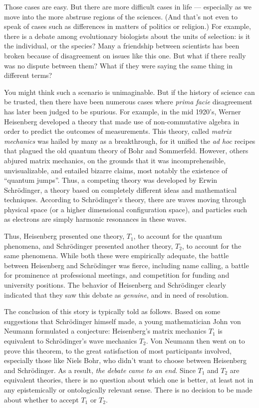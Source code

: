 Those cases are easy.  But there are more difficult cases in life ---
especially as we move into the more abstruse regions of the sciences.
(And that's not even to speak of cases such as differences in matters
of politics or religion.)  For example, there is a debate among
evolutionary biologists about the units of selection: is it the
individual, or the species?  Many a friendship between scientists has
been broken because of disagreement on issues like this one.  But what
if there really was no dispute between them?  What if they were saying
the same thing in different terms?

You might think such a scenario is unimaginable.  But if the history
of science can be trusted, then there have been numerous cases where
{\it prima facie} disagreement has later been judged to be spurious.
For example, in the mid 1920's, Werner Heisenberg developed a theory
that made use of non-commutative algebra in order to predict the
outcomes of measurements.  This theory, called {\it matrix mechanics}
was hailed by many as a breakthrough, for it unified the {\it ad hoc}
recipes that plagued the old quantum theory of Bohr and Sommerfeld.
However, others abjured matrix mechanics, on the grounds that it was
incomprehensible, unvisualizable, and entailed bizarre claims, most
notably the existence of ``quantum jumps''.  Thus, a competing theory
was developed by Erwin Schr{\"o}dinger, a theory based on completely
different ideas and mathematical techniques.  According to
Schr{\"o}dinger's theory, there are waves moving through physical
space (or a higher dimensional configuration space), and particles
such as electrons are simply harmonic resonances in these waves.

Thus, Heisenberg presented one theory, $T_1$, to account for the
quantum phenomena, and Schr{\"o}dinger presented another theory,
$T_2$, to account for the same phenomena.  While both these were
empirically adequate, the battle between Heisenberg and
Schr{\"o}dinger was fierce, including name calling, a battle for
prominence at professional meetings, and competition for funding and
university positions.  The behavior of Heisenberg and Schr{\"o}dinger
clearly indicated that they saw this debate as {\it genuine}, and in
need of resolution.

The conclusion of this story is typically told as follows.  Based on
some suggestions that Schr{\"o}dinger himself made, a young
mathematician John von Neumann formulated a conjecture: Heisenberg's
matrix mechanics $T_1$ is equivalent to Schr{\"o}dinger's wave
mechanics $T_2$.  Von Neumann then went on to prove this theorem, to
the great satisfaction of most participants involved, especially those
like Niels Bohr, who didn't want to choose between Heisenberg and
Schr{\"o}dinger.  As a result, {\it the debate came to an end}.  Since
$T_1$ and $T_2$ are equivalent theories, there is no question about
which one is better, at least not in any epistemically or
ontologically relevant sense.  There is no decision to be made about
whether to accept $T_1$ or $T_2$.

